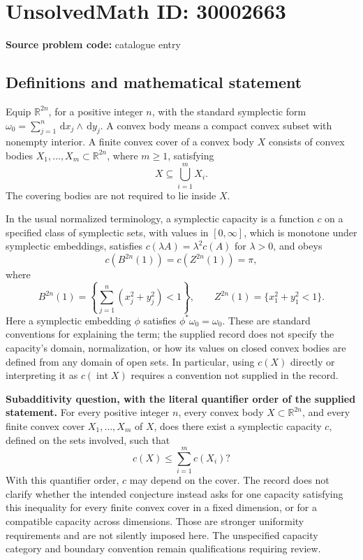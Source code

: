 \documentclass[11pt]{article}
\newcommand{\R}{\mathbb{R}}
\newcommand{\dd}{\,\mathrm{d}}
\begin{document}
\section*{UnsolvedMath ID: 30002663}
\textbf{Source problem code:} catalogue entry
\subsection{Definitions and mathematical statement}
Equip \(\R^{2n}\), for a positive integer \(n\), with the standard symplectic form \(\omega_0=\sum_{j=1}^{n}\dd x_j\wedge\dd y_j\). A convex body means a compact convex subset with nonempty interior. A finite convex cover of a convex body \(X\) consists of convex bodies \(X_1,\ldots,X_m\subset\R^{2n}\), where \(m\geq1\), satisfying
\[
X\subseteq\bigcup_{i=1}^{m}X_i.
\]
The covering bodies are not required to lie inside \(X\).

In the usual normalized terminology, a symplectic capacity is a function \(c\) on a specified class of symplectic sets, with values in \([0,\infty]\), which is monotone under symplectic embeddings, satisfies \(c(\lambda A)=\lambda^2c(A)\) for \(\lambda>0\), and obeys
\[
c(B^{2n}(1))=c(Z^{2n}(1))=\pi,
\]
where
\[
B^{2n}(1)=\left\{\sum_{j=1}^{n}(x_j^2+y_j^2)<1\right\},
\qquad
Z^{2n}(1)=\{x_1^2+y_1^2<1\}.
\]
Here a symplectic embedding \(\phi\) satisfies \(\phi^*\omega_0=\omega_0\). These are standard conventions for explaining the term; the supplied record does not specify the capacity's domain, normalization, or how its values on closed convex bodies are defined from any domain of open sets. In particular, using \(c(X)\) directly or interpreting it as \(c(\operatorname{int}X)\) requires a convention not supplied in the record.

\textbf{Subadditivity question, with the literal quantifier order of the supplied statement.} For every positive integer \(n\), every convex body \(X\subset\R^{2n}\), and every finite convex cover \(X_1,\ldots,X_m\) of \(X\), does there exist a symplectic capacity \(c\), defined on the sets involved, such that
\[
c(X)\leq\sum_{i=1}^{m}c(X_i)?
\]
With this quantifier order, \(c\) may depend on the cover. The record does not clarify whether the intended conjecture instead asks for one capacity satisfying this inequality for every finite convex cover in a fixed dimension, or for a compatible capacity across dimensions. Those are stronger uniformity requirements and are not silently imposed here. The unspecified capacity category and boundary convention remain qualifications requiring review.
\end{document}
